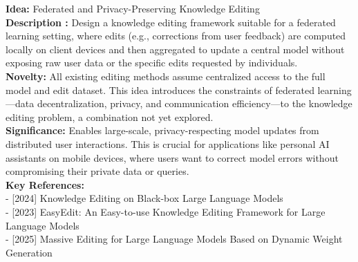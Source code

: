 \documentclass{llmxive}
\begin{document}
\begin{tcolorbox}[breakable,colback=persona!20!white, colframe=persona!60!black, title=\textbf{An Example of Idea Generation}]
    \label{box:idea_generation}
    \textbf{Idea:} Federated and Privacy-Preserving Knowledge Editing\\
    \textbf{Description :} Design a knowledge editing framework suitable for a federated learning setting, where edits (e.g., corrections from user feedback) are computed locally on client devices and then aggregated to update a central model without exposing raw user data or the specific edits requested by individuals.\\
    \textbf{Novelty:} All existing editing methods assume centralized access to the full model and edit dataset. This idea introduces the constraints of federated learning—data decentralization, privacy, and communication efficiency—to the knowledge editing problem, a combination not yet explored.\\
    \textbf{Significance:} Enables large-scale, privacy-respecting model updates from distributed user interactions. This is crucial for applications like personal AI assistants on mobile devices, where users want to correct model errors without compromising their private data or queries.\\
    \textbf{Key References:}\\
    - [2024] Knowledge Editing on Black-box Large Language Models\\
    - [2023] EasyEdit: An Easy-to-use Knowledge Editing Framework for Large Language Models\\
    - [2025] Massive Editing for Large Language Models Based on Dynamic Weight Generation
\end{tcolorbox}
\end{document}
